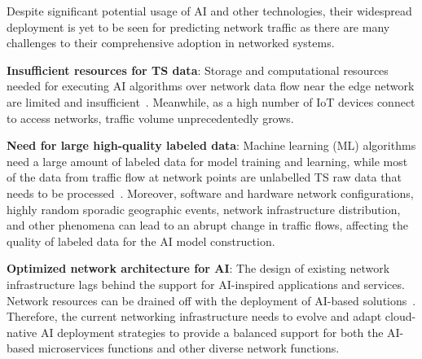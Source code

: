 \documentclass[10pt, conference]{IEEEtran}
\newcommand{\fakeparagraph}[1]{\vspace{.1mm}\noindent\textbf{#1}}
\newcommand{\fakepar}[1]{\fakeparagraph{#1}}
\begin{document}
Despite significant potential usage of AI and other technologies, their widespread deployment is yet to be seen for predicting network traffic as there are many challenges to their comprehensive adoption in networked systems. 

\fakepar{Insufficient resources for TS data}: Storage and computational resources needed for executing AI algorithms over network data flow near the edge network are limited and insufficient~\cite{Roadmap}. Meanwhile, as a high number of IoT devices connect to access networks, traffic volume unprecedentedly grows.

\fakepar{Need for large high-quality labeled data}: 
Machine learning (ML) algorithms need a large amount of labeled data for model training and learning, while most of the data from traffic flow at network points are unlabelled TS raw data that needs to be processed~\cite{timeseries}. Moreover, software and hardware network configurations, highly random sporadic geographic events, network infrastructure distribution, and other phenomena can lead to an abrupt change in traffic flows, affecting the quality of labeled data for the AI model construction.

\fakepar{Optimized network architecture for AI}: The design of existing network infrastructure lags behind the support for AI-inspired applications and services. Network resources can be drained off with the deployment of AI-based solutions~\cite{tang2021computing}. Therefore, the current networking infrastructure needs to evolve and adapt cloud-native AI deployment strategies to provide a balanced support for both the AI-based microservices functions and other diverse network functions.
\end{document}
